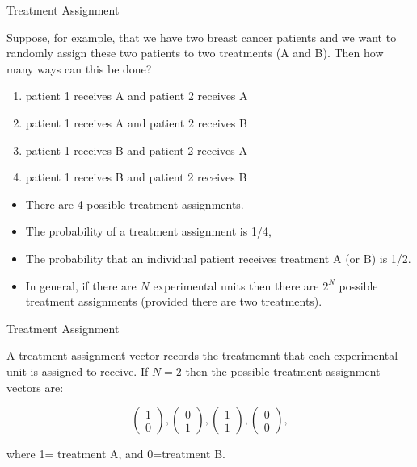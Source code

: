 \documentclass[10pt,ignorenonframetext,]{beamer}
\providecommand{\tightlist}{%
\setlength{\itemsep}{0pt}\setlength{\parskip}{0pt}}
\begin{document}
\begin{frame}{Treatment Assignment}

Suppose, for example, that we have two breast cancer patients and we
want to randomly assign these two patients to two treatments (A and B).
Then how many ways can this be done?

\begin{enumerate}
\def\labelenumi{\arabic{enumi}.}
\tightlist
\item
  patient 1 receives A and patient 2 receives A
\item
  patient 1 receives A and patient 2 receives B
\item
  patient 1 receives B and patient 2 receives A
\item
  patient 1 receives B and patient 2 receives B
\end{enumerate}

\begin{itemize}
\tightlist
\item
  There are 4 possible treatment assignments.
\item
  The probability of a treatment assignment is 1/4,
\item
  The probability that an individual patient receives treatment A (or B)
  is 1/2.\\
\item
  In general, if there are \(N\) experimental units then there are
  \(2^N\) possible treatment assignments (provided there are two
  treatments).
\end{itemize}

\end{frame}

\begin{frame}{Treatment Assignment}

A treatment assignment vector records the treatmemnt that each
experimental unit is assigned to receive. If \(N=2\) then the possible
treatment assignment vectors are:

\[\begin{pmatrix} 
  1 \\
  0
 \end{pmatrix}, \begin{pmatrix}
 0 \\
  1
 \end{pmatrix},\begin{pmatrix}
 1 \\
  1
 \end{pmatrix},\begin{pmatrix}
 0 \\
  0
 \end{pmatrix},\]

where 1= treatment A, and 0=treatment B.

\end{frame}
\end{document}
